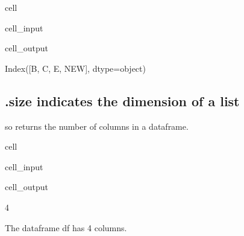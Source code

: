 \documentclass[letterpaper,10pt,english]{jupyterBook}
\begin{document}
\begin{sphinxuseclass}{cell}\begin{sphinxVerbatimInput}

\begin{sphinxuseclass}{cell_input}
\begin{sphinxVerbatim}[commandchars=\\\{\}]
\end{sphinxVerbatim}

\end{sphinxuseclass}\end{sphinxVerbatimInput}
\begin{sphinxVerbatimOutput}

\begin{sphinxuseclass}{cell_output}
\begin{sphinxVerbatim}[commandchars=\\\{\}]
Index([\PYGZsq{}B\PYGZsq{}, \PYGZsq{}C\PYGZsq{}, \PYGZsq{}E\PYGZsq{}, \PYGZsq{}NEW\PYGZsq{}], dtype=\PYGZsq{}object\PYGZsq{})
\end{sphinxVerbatim}

\end{sphinxuseclass}\end{sphinxVerbatimOutput}

\end{sphinxuseclass}

\subsection{.size indicates the dimension of a list}
\label{\detokenize{content/04_PythonEssentials/PythonPackagesEtc:size-indicates-the-dimension-of-a-list}}
\sphinxAtStartPar
so  returns the number of columns in a dataframe.

\begin{sphinxuseclass}{cell}\begin{sphinxVerbatimInput}

\begin{sphinxuseclass}{cell_input}
\begin{sphinxVerbatim}[commandchars=\\\{\}]
\end{sphinxVerbatim}

\end{sphinxuseclass}\end{sphinxVerbatimInput}
\begin{sphinxVerbatimOutput}

\begin{sphinxuseclass}{cell_output}
\begin{sphinxVerbatim}[commandchars=\\\{\}]
4
\end{sphinxVerbatim}

\end{sphinxuseclass}\end{sphinxVerbatimOutput}

\end{sphinxuseclass}
\sphinxAtStartPar
The dataframe df has 4 columns.
\end{document}
